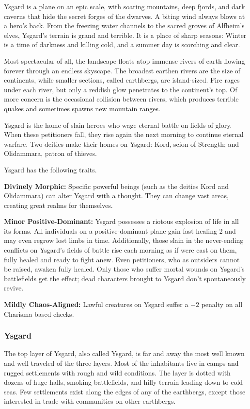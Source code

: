 Ysgard is a plane on an epic scale, with soaring mountains, deep fjords, and dark caverns that hide the secret forges of the dwarves. A biting wind always blows at a hero's back. From the freezing water channels to the sacred groves of Alfheim's elves, Ysgard's terrain is grand and terrible. It is a place of sharp seasons: Winter is a time of darkness and killing cold, and a summer day is scorching and clear.

Most spectacular of all, the landscape floats atop immense rivers of earth flowing forever through an endless skyscape. The broadest earthen rivers are the size of continents, while smaller sections, called earthbergs, are island-sized. Fire rages under each river, but only a reddish glow penetrates to the continent's top. Of more concern is the occasional collision between rivers, which produces terrible quakes and sometimes spawns new mountain ranges.

Ysgard is the home of slain heroes who wage eternal battle on fields of glory. When these petitioners fall, they rise again the next morning to continue eternal warfare. Two deities make their homes on Ysgard: Kord, scion of Strength; and Olidammara, patron of thieves.

Ysgard has the following traits.
\begin{itemize*}
\item \textbf{Divinely Morphic:} Specific powerful beings (such as the deities Kord and Olidammara) can alter Ysgard with a thought. They can change vast areas, creating great realms for themselves.
\item \textbf{Minor Positive-Dominant:} Ysgard possesses a riotous explosion of life in all its forms. All individuals on a positive-dominant plane gain fast healing 2 and may even regrow lost limbs in time. Additionally, those slain in the never-ending conflicts on Ysgard's fields of battle rise each morning as if  were cast on them, fully healed and ready to fight anew. Even petitioners, who as outsiders cannot be raised, awaken fully healed. Only those who suffer mortal wounds on Ysgard's battlefields get the  effect; dead characters brought to Ysgard don't spontaneously revive.
\item \textbf{Mildly Chaos-Aligned:} Lawful creatures on Ysgard suffer a $-2$ penalty on all Charisma-based checks.
\end{itemize*}

\subsubsection{Ysgard}
The top layer of Ysgard, also called Ysgard, is far and away the most well known and well traveled of the three layers. Most of the inhabitants live in camps and rugged settlements with rough and wild conditions. The layer is dotted with dozens of huge halls, smoking battlefields, and hilly terrain leading down to cold seas. Few settlements exist along the edges of any of the earthbergs, except those interested in trade with communities on other earthbergs.

